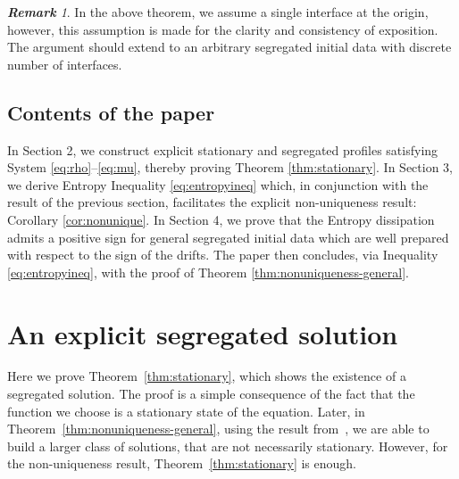 \documentclass[a4paper,twosided, 11pt]{article}
\theoremstyle{plain}
\theoremstyle{remark}
\newtheorem{remark}[thm]{\bf Remark}
\numberwithin{equation}{section}
\begin{document}
\begin{remark}
    In the above theorem, we assume a single interface at the origin, however, this assumption is made for the clarity and consistency of exposition. 
    The argument should extend to an arbitrary segregated initial data with discrete number of interfaces.
\end{remark}
\subsection{Contents of the paper}
    In Section 2, we construct explicit stationary and segregated profiles satisfying System \eqref{eq:rho}--\eqref{eq:mu}, thereby proving Theorem \ref{thm:stationary}. 
    In Section 3, we derive Entropy Inequality \eqref{eq:entropyineq} which, in conjunction with the result of the previous section, facilitates the explicit non-uniqueness result: Corollary \ref{cor:nonunique}. 
    In Section 4, we prove that the Entropy dissipation admits a positive sign for general segregated initial data which are well prepared with respect to the sign of the drifts. 
    The paper then concludes, via Inequality \eqref{eq:entropyineq}, with the proof of Theorem \ref{thm:nonuniqueness-general}.

\section{An explicit segregated solution}

Here we prove Theorem~\ref{thm:stationary}, which shows the existence of a segregated solution. The proof is a simple consequence of the fact that the function we choose is a stationary state of the equation. Later, in Theorem~\ref{thm:nonuniqueness-general}, using the result from~\cite{santambrogioschulz2026segregated}, we are able to build a larger class of solutions, that are not necessarily stationary. However, for the non-uniqueness result, Theorem~\ref{thm:stationary} is enough.
\end{document}
